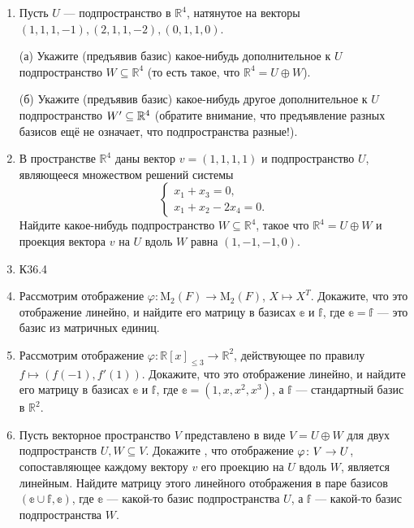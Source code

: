 \documentclass[10pt, a4paper]{extarticle}
\def \R{\mathbb{R}}
\theoremstyle{definition}
\begin{document}
\begin{enumerate}

    \item Пусть $U$ --- подпространство в $\R^4$, натянутое на векторы $(1,1,1,-1), (2,1,1,-2), (0,1,1,0)$.

    (а) Укажите (предъявив базис) какое-нибудь дополнительное к $U$ подпространство $W \subseteq \R^4$ (то есть такое, что $\R^4 = U \oplus W$).

    (б) Укажите (предъявив базис) какое-нибудь другое дополнительное к $U$ подпространство $W' \subseteq\nobreak \R^4$ (обратите внимание, что предъявление разных базисов ещё не означает, что подпространства разные!).


    \item
    В пространстве $\R^4$ даны вектор $v = (1,1,1,1)$ и подпространство $U$, являющееся множеством решений системы
    \[
    \begin{cases} x_1 + x_3 = 0, \\ x_1 + x_2 - 2x_4 = 0. \end{cases}
    \]
    Найдите какое-нибудь подпространство $W \subseteq \R^4$, такое что $\R^4 = U \oplus W$ и проекция вектора $v$ на $U$ вдоль $W$ равна $(1,-1,-1,0)$.


    \item К36.4

    \item
    Рассмотрим отображение $\varphi \colon \mathrm{M}_2(F) \to \mathrm{M}_2(F)$, $X \mapsto X^T$. Докажите, что это отображение линейно, и найдите его матрицу в базисах $\mathbb e$ и $\mathbb f$, где $\mathbb e = \mathbb f$ --- это базис из матричных единиц.

    \item
    Рассмотрим отображение $\varphi \colon \R[x]_{\leqslant 3} \to \R^2$, действующее по правилу $f \mapsto (f(-1), f'(1))$. Докажите, что это отображение линейно, и найдите его матрицу в базисах $\mathbb e$ и $\mathbb f$, где $\mathbb e = (1,x,x^2,x^3)$, а $\mathbb f$ --- стандартный базис в $\R^2$.

    \item
    Пусть векторное пространство $V$ представлено в виде $V = U \oplus W$ для двух подпространств $U,W \subseteq V$.
    Докажите , что отображение $\varphi \colon V \to\nobreak U$, сопоставляющее каждому вектору $v$ его проекцию на $U$ вдоль $W$, является линейным.
    Найдите матрицу этого линейного отображения в паре базисов $(\mathbb e \cup \mathbb f, \mathbb e)$, где $\mathbb e$ --- какой-то базис подпространства $U$, а $\mathbb f$ --- какой-то базис подпространства $W$.


\end{enumerate}
\end{document}
